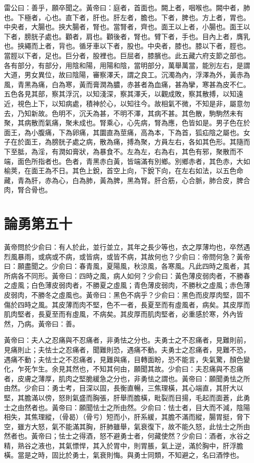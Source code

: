 雷公曰：善乎，願卒聞之。黃帝曰：庭者，首面也。闕上者，咽喉也。闕中者，肺也。下極者，心也。直下者，肝也。肝左者，膽也。下者，脾也。方上者，胃也。中央者，大腸也。挾大腸者，腎也。當腎者，齊也。面王以上者，小腸也。面王以下者，膀胱子處也。顴者，肩也。顴後者，腎也。臂下者，手也。目內上者，膺乳也。挾繩而上者，背也。循牙車以下者，股也。中央者，膝也。膝以下者，脛也。當脛以下者，足也。巨分者，股裡也。巨屈者，膝臏也。此五藏六府支節之部也。
各有部分，有部分，用陰和陽，用陽和陰，當明部分，萬舉萬當，能別左右，是謂大道，男女異位，故曰陰陽，審察澤夭，謂之良工。沉濁為內，浮澤為外，黃赤為風，青黑為痛，白為寒，黃而膏潤為膿，赤甚者為血痛，甚為攣，寒甚為皮不仁。五色各見其部，察其浮沉，以知淺深，察其澤夭，以觀成敗，察其散搏，以知遠近，視色上下，以知病處，積神於心，以知往今。故相氣不微，不知是非，屬意勿去，乃知新故。色明不，沉夭為甚，不明不澤，其病不甚。其色散，駒駒然未有聚，其病散而氣痛，聚未成也。腎乘心，心先病，腎為應，色皆如是。男子色在於面王，為小腹痛，下為卵痛，其圜直為莖痛，高為本，下為首，狐疝陰之屬也。女子在於面王，為膀胱子處之病，散為痛，搏為聚，方員左右，各如其色形。其隨而下至胝，為淫，有潤如膏狀，為暴食不。左為左，右為右，其色有邪，聚散而不端，面色所指者也。色者，青黑赤白黃，皆端滿有別鄉。別鄉赤者，其色赤，大如榆莢，在面王為不日。其色上銳，首空上向，下銳下向，在左右如法，以五色命藏，青為肝，赤為心，白為肺，黃為脾，黑為腎。肝合筋，心合脈，肺合皮，脾合肉，腎合骨也。

\section{論勇第五十}

黃帝問於少俞曰：有人於此，並行並立，其年之長少等也，衣之厚薄均也，卒然遇烈風暴雨，或病或不病，或皆病，或皆不病，其故何也？少俞曰：帝問何急？黃帝曰：願盡聞之。少俞曰：春青風，夏陽風，秋涼風，各寒風。凡此四時之風者，其所病各不同形。黃帝曰：四時之風，病人如何？少俞曰：黃色薄皮弱肉者，不勝春之虛風；白色薄皮弱肉者，不勝夏之虛風；青色薄皮弱肉，不勝秋之虛風；赤色薄皮弱肉，不勝冬之虛風也。黃帝曰：黑色不病乎？少俞曰：黑色而皮厚肉堅，固不傷於四時之風。其皮薄而肉不堅，色不一者，長夏至而有虛風者，病矣。其皮厚而肌肉堅者，長夏至而有虛風，不病矣。其皮厚而肌肉堅者，必重感於寒，外內皆然，乃病。黃帝曰：善。

黃帝曰：夫人之忍痛與不忍痛者，非勇怯之分也。夫勇士之不忍痛者，見難則前，見痛則止；夫怯士之忍痛者，聞難則恐，遇痛不動。夫勇士之忍痛者，見難不恐，遇痛不動；夫怯士之不忍痛者，見難與痛，目轉面盼，恐不能言，失氣驚，顏色變化，乍死乍生。余見其然也，不知其何由，願聞其故。少俞曰：夫忍痛與不忍痛者，皮膚之薄厚，肌肉之堅脆緩急之分也，非勇怯之謂也。黃帝曰：願聞勇怯之所由然。少俞曰：勇士考，目深以固，長衡直暢，三焦理橫，其心端直，其肝大以堅，其膽滿以傍，怒則氣盛而胸張，肝舉而膽橫，毗裂而目揚，毛起而面蒼，此勇士之由然者也。黃帝曰：願聞怯士之所由然。少俞曰：怯士者，目大而不減，陰陽相失，其焦理縱，（骨曷）（骨亏）短而小，肝系緩，其膽不滿而縱，腸胃挺，脅下空，雖方大怒，氣不能滿其胸，肝肺雖舉，氣衰復下，故不能久怒，此怯士之所由然者也。黃帝曰；怯士之得酒，怒不避勇士者，何藏使然？少俞曰：酒者，水谷之精，熟谷之液也，其氣慓悍，其入於胃中，則胃脹，氣上逆，滿於胸中，肝浮膽橫。當是之時，固比於勇士，氣衰則悔。與勇士同類，不知避之，名曰酒悖也。




